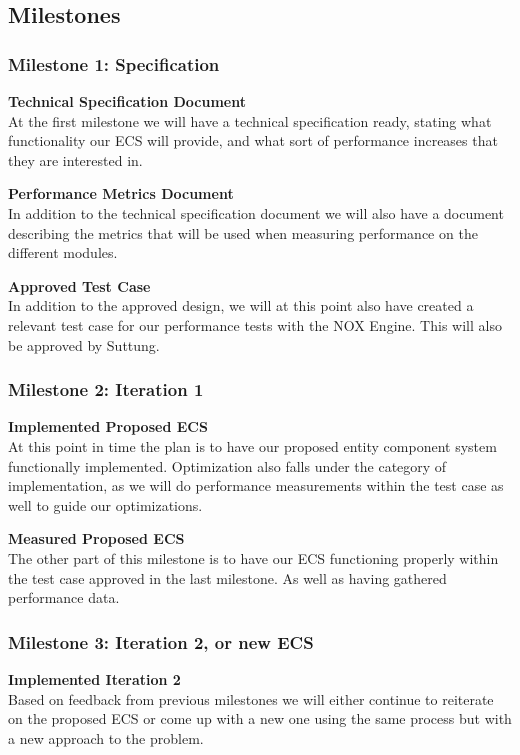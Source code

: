 \subsection{Milestones}
\subsubsection{Milestone 1: Specification}
\noindent\textbf{Technical Specification Document}\\
At the first milestone we will have a technical specification ready,
stating what functionality our ECS will provide, and what sort of performance
increases that they are interested in.

\noindent\textbf{Performance Metrics Document}\\
In addition to the technical specification document we will also have a document
describing the metrics that will be used when measuring performance on the different modules.

\noindent\textbf{Approved Test Case}\\
In addition to the approved design, we will at this point also have created a
relevant test case for our performance tests with the NOX Engine. 
This will also be approved by Suttung.

\subsubsection{Milestone 2: Iteration 1}
\noindent\textbf{Implemented Proposed ECS}\\
At this point in time the plan is to have our proposed entity component system
functionally implemented.
Optimization also falls under the category of implementation, as we will do 
performance measurements within the test case as well to guide our optimizations.

\noindent\textbf{Measured Proposed ECS}\\
The other part of this milestone is to have our ECS functioning properly within
the test case approved in the last milestone. As well as having gathered performance data.

\subsubsection{Milestone 3: Iteration 2, or new ECS}
\noindent\textbf{Implemented Iteration 2}\\
Based on feedback from previous milestones we will either continue to reiterate on the proposed
ECS or come up with a new one using the same process but with a new approach to the problem.


